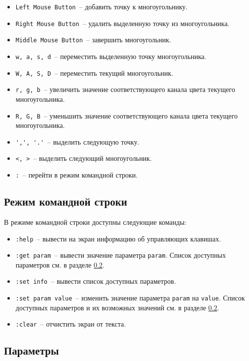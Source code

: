 \documentclass[oneside, final, 10pt]{extarticle}
\begin{document}
\begin{itemize}
	\item \verb~Left Mouse Button~~-- добавить точку к многоугольнику.
	\item \verb~Right Mouse Button~~-- удалить выделенную точку из многоугольника.
	\item \verb~Middle Mouse Button~~-- завершить многоугольник.
	\item \verb~w, a, s, d~~-- переместить выделенную точку многоугольника.
	\item \verb~W, A, S, D~~-- переместить текущий многоугольник.
	\item \verb~r, g, b~~-- увеличить значение соответствующего канала цвета текущего многоугольника.
	\item \verb~R, G, B~~-- уменьшить значение соответствующего канала цвета текущего многоугольника.
	\item \verb~',', '.'~~-- выделить следующую точку.
	\item \verb~<, >~~-- выделить следующий многоугольник.
	\item \verb~:~~-- перейти в режим командной строки.
\end{itemize}

\subsection{Режим командной строки}

В режиме командной строки доступны следующие команды:

\begin{itemize}
	\item \verb~:help~~-- вывести на экран информацию об управляющих клавишах.
	\item \verb~:get param~~-- вывести значение параметра \verb~param~. Список доступных параметров см. в разделе \ref{param}.
	\item \verb~:set info~~-- вывести список доступных параметров.
\item \verb~:set param value~~-- изменить значение параметра \verb~param~ на \verb~value~. Список доступных параметров и их возможных значений см. в разделе \ref{param}.
	\item \verb~:clear~~-- отчистить экран от текста.
\end{itemize}

\subsection{Параметры} \label{param}
\end{document}
